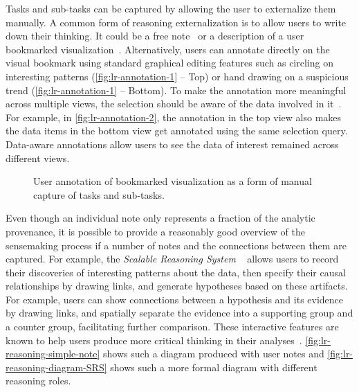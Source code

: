 Tasks and sub-tasks can be captured by allowing the user to externalize them manually. A common form of reasoning externalization is to allow users to write down their thinking. It could be a free note~\cite{Shrinivasan2008} or a description of a user bookmarked visualization~\cite{Heer2009,Walker2013}. Alternatively, users can annotate directly on the visual bookmark using standard graphical editing features such as circling on interesting patterns (\autoref{fig:lr-annotation-1} -- Top) or hand drawing on a suspicious trend (\autoref{fig:lr-annotation-1} -- Bottom). To make the annotation more meaningful across multiple views, the selection should be aware of the data involved in it~\cite{Heer2008a}. For example, in \autoref{fig:lr-annotation-2}, the annotation in the top view also makes the data items in the bottom view get annotated using the same selection query. Data-aware annotations allow users to see the data of interest remained across different views.

\begin{figure}
\centering
{}
\hspace{1cm}
\caption[User annotation of bookmarked visualization]{User annotation of bookmarked visualization as a form of manual capture of tasks and sub-tasks. }
\label{fig:lr-annotation}
\end{figure}

Even though an individual note only represents a fraction of the analytic provenance, it is possible to provide a reasonably good overview of the sensemaking process if a number of notes and the connections between them are captured. For example, the \emph{Scalable Reasoning System} ~\cite{Pike2009} allows users to record their discoveries of interesting patterns about the data, then specify their causal relationships by drawing links, and generate hypotheses based on these artifacts. For example, users can show connections between a hypothesis and its evidence by drawing links, and spatially separate the evidence into a supporting group and a counter group, facilitating further comparison. These interactive features are known to help users produce more critical thinking in their analyses~\cite{Sedig2013}.  \autoref{fig:lr-reasoning-simple-note} shows such a diagram produced with user notes and \autoref{fig:lr-reasoning-diagram-SRS} shows such a more formal diagram with different reasoning roles.

